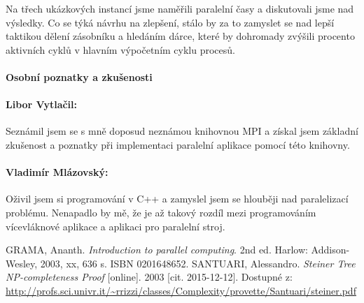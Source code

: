 \documentclass[12pt]{article}
\theoremstyle{definition}
\begin{document}
Na třech ukázkových instancí jsme naměřili paralelní časy a diskutovali jsme nad výsledky.
Co se týká návrhu na zlepšení, stálo by za to zamyslet se nad lepší taktikou dělení zásobníku
a hledáním dárce, které by dohromady zvýšili procento aktivních cyklů v hlavním výpočetním cyklu procesů.
\paragraph{Osobní poznatky a zkušenosti}\mbox{}
\paragraph{Libor Vytlačil:} Seznámil jsem se s mně doposud neznámou knihovnou MPI a získal
jsem základní zkušenost a poznatky při implementaci paralelní aplikace pomocí této knihovny.

\paragraph{Vladimír Mlázovský:} Oživil jsem si programování v C++ a zamyslel jsem se hlouběji nad paralelizací problému. Nenapadlo
by mě, že je až takový rozdíl mezi programováním vícevláknové aplikace a aplikaci pro paralelní stroj.
\begin{thebibliography}{9}
	GRAMA, Ananth. \emph{Introduction to parallel computing}. 2nd ed. Harlow: Addison-Wesley, 2003, xx, 636 s. ISBN 0201648652.
	SANTUARI, Alessandro. \emph{Steiner Tree NP-completeness Proof} [online]. 2003 [cit. 2015-12-12]. Dostupné z: \url{http://profs.sci.univr.it/~rrizzi/classes/Complexity/provette/Santuari/steiner.pdf}	
\end{thebibliography}
\end{document}
